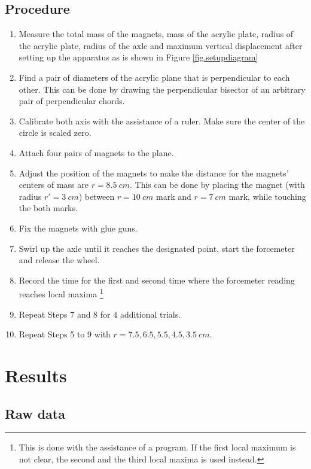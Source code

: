 \documentclass[a4paper]{article}
\begin{document}
\subsection{Procedure}

\begin{enumerate}
    \item Measure the total mass of the magnets, mass of the acrylic plate, radius of the acrylic plate, radius of the axle and maximum vertical displacement after setting up the apparatus as is shown in Figure \ref{fig.setupdiagram}
    \item Find a pair of diameters of the acrylic plane that is perpendicular to each other. This can be done by drawing the perpendicular bisector of an arbitrary pair of perpendicular chords. 
    \item Calibrate both axis with the assistance of a ruler. Make sure the center of the circle is scaled zero. 
    \item Attach four pairs of magnets to the plane.
    \item Adjust the position of the magnets to make the distance for the magnets' centers of mass are $r = \SI{8.5}{cm}$. This can be done by placing the magnet (with radius $r' = \SI{3}{cm}$) between $r = \SI{10}{cm}$ mark and $r = \SI{7}{cm}$ mark, while touching the both marks.
    \item Fix the magnets with glue guns.
    \item Swirl up the axle until it reaches the designated point, start the forcemeter and release the wheel. 
    \item Record the time for the first and second time where the forcemeter reading reaches local maxima \footnote{This is done with the assistance of a program. If the first local maximum is not clear, the second and the third local maxima is used instead.} 
    \item Repeat Steps 7 and 8 for $4$ additional trials.
    \item Repeat Steps 5 to 9 with $r = 7.5, 6.5, 5.5, 4.5, 3.5 \SI{}{cm}$.
\end{enumerate}

\section{Results}

\subsection{Raw data}
\end{document}
